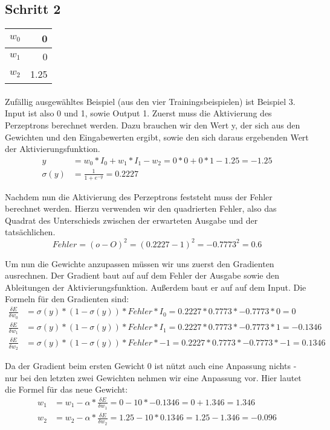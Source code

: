 \documentclass[a4paper]{article}
\begin{document}
\subsection{Schritt 2}
\begin{tabular}{|l|r|}
	\hline
	$w_0$ & 0 \\\hline
	$w_1$ & 0 \\\hline
	$w_2$ & 1.25 \\\hline
\end{tabular}
\paragraph{}
Zufällig ausgewähltes Beispiel (aus den vier Trainingsbeispielen) ist Beispiel 3. Input ist also 0 und 1, sowie Output 1.
Zuerst muss die Aktivierung des Perzeptrons berechnet werden. Dazu brauchen wir den Wert y, der sich aus den Gewichten und den Eingabewerten ergibt, sowie den sich daraus ergebenden Wert der Aktivierungsfunktion.
\begin{align*}
	y &= w_0 * I_0 + w_1 * I_1 - w_2 = 0 * 0 + 0 * 1 - 1.25 = -1.25 \\
	\sigma(y) &= \frac{1}{1 + e^{-y}} = 0.2227
\end{align*}

Nachdem nun die Aktivierung des Perzeptrons feststeht muss der Fehler berechnet werden. Hierzu verwenden wir den quadrierten Fehler, also das Quadrat des Unterschieds zwischen der erwarteten Ausgabe und der tatsächlichen.
\[
	Fehler = (o - O)^2 = (0.2227 - 1)^2 = -0.7773^2 = 0.6
\]

Um nun die Gewichte anzupassen müssen wir uns zuerst den Gradienten ausrechnen.
Der Gradient baut auf auf dem Fehler der Ausgabe sowie den Ableitungen der Aktivierungsfunktion. Außerdem baut er auf auf dem Input. Die Formeln für den Gradienten sind:
\begin{align*}
	\frac{\delta E}{\delta w_0} &= \sigma(y) * (1 - \sigma(y)) * Fehler * I_0 = 0.2227 * 0.7773 * -0.7773 * 0 = 0 \\
	\frac{\delta E}{\delta w_1} &= \sigma(y) * (1 - \sigma(y)) * Fehler * I_1 = 0.2227 * 0.7773 * -0.7773 * 1 = -0.1346 \\
	\frac{\delta E}{\delta w_2} &= \sigma(y) * (1 - \sigma(y)) * Fehler * -1 = 0.2227 * 0.7773 * -0.7773 * -1 = 0.1346
\end{align*}

Da der Gradient beim ersten Gewicht 0 ist nützt auch eine Anpassung nichts - nur bei den letzten zwei Gewichten nehmen wir eine Anpassung vor. Hier lautet die Formel für das neue Gewicht:
\begin{align*}
	w_1 &= w_1 - \alpha * \frac{\delta E}{\delta w_1} = 0 - 10 * -0.1346 = 0 + 1.346 = 1.346 \\
	w_2 &= w_2 - \alpha * \frac{\delta E}{\delta w_2} = 1.25 - 10 * 0.1346 = 1.25 - 1.346 = -0.096
\end{align*}
\end{document}
